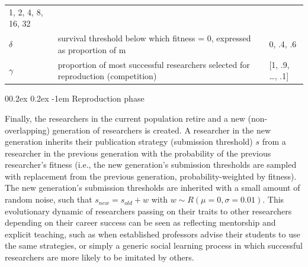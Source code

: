 \documentclass[british,,man,mask,floatsintext]{apa6}
\makeatletter
\renewcommand{\paragraph}{\@startsection{paragraph}{4}{\parindent}%
  {0\baselineskip \@plus 0.2ex \@minus 0.2ex}%
  {-1em}%
  {\normalfont\normalsize\bfseries\itshape\typesectitle}}
\makeatother
\begin{document}
\begin{longtable}[]{@{}lll@{}}
\begin{minipage}[t]{0.27\columnwidth}
1, 2, 4, 8, 16, 32\strut
\end{minipage}\tabularnewline
\begin{minipage}[t]{0.32\columnwidth}\raggedright
\(\delta\)\strut
\end{minipage} & \begin{minipage}[t]{0.32\columnwidth}\raggedright
survival threshold below which fitness = 0, expressed as proportion of m\strut
\end{minipage} & \begin{minipage}[t]{0.27\columnwidth}\raggedright
0, .4, .6\strut
\end{minipage}\tabularnewline
\begin{minipage}[t]{0.32\columnwidth}\raggedright
\(\gamma\)\strut
\end{minipage} & \begin{minipage}[t]{0.32\columnwidth}\raggedright
proportion of most successful researchers selected for reproduction (competition)\strut
\end{minipage} & \begin{minipage}[t]{0.27\columnwidth}\raggedright
{[}1, .9, \ldots{}, .1{]}\strut
\end{minipage}\tabularnewline
\bottomrule
\end{longtable}

\hypertarget{reproduction-phase}{%
\paragraph{Reproduction phase}\label{reproduction-phase}}

Finally, the researchers in the current population retire and a new (non-overlapping) generation of researchers is created.
A researcher in the new generation inherits their publication strategy (submission threshold) \(s\) from a researcher in the previous generation with the probability of the previous researcher's fitness (i.e., the new generation's submission thresholds are sampled with replacement from the previous generation, probability-weighted by fitness).
The new generation's submission thresholds are inherited with a small amount of random noise, such that \(s_{new} = s_{old} + w\) with \(w \sim R(\mu = 0, \sigma = 0.01)\).
This evolutionary dynamic of researchers passing on their traits to other researchers depending on their career success can be seen as reflecting mentorship and explicit teaching, such as when established professors advise their students to use the same strategies, or simply a generic social learning process in which successful researchers are more likely to be imitated by others.
\end{document}
